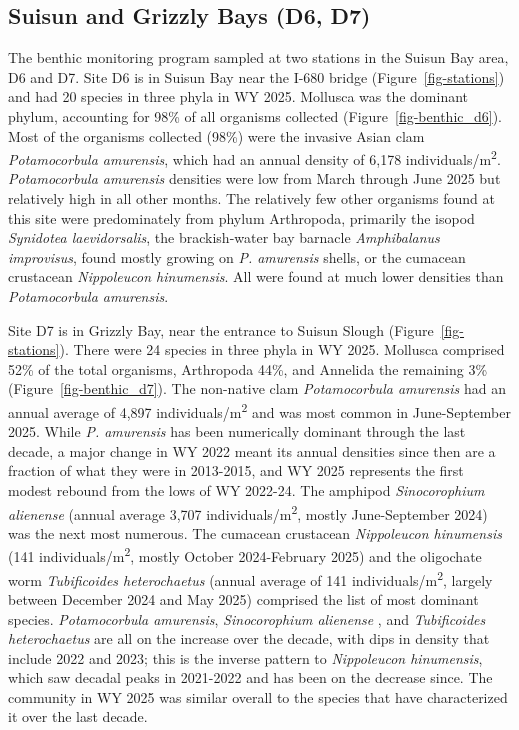 \documentclass[
  letterpaper,
]{article}
\begin{document}
\subsection{Suisun and Grizzly Bays (D6,
D7)}\label{suisun-and-grizzly-bays-d6-d7}

The benthic monitoring program sampled at two stations in the Suisun Bay
area, D6 and D7. Site D6 is in Suisun Bay near the I-680 bridge
(Figure~\ref{fig-stations}) and had 20 species in three phyla in WY
2025. Mollusca was the dominant phylum, accounting for 98\% of all
organisms collected (Figure~\ref{fig-benthic_d6}). Most of the organisms
collected (98\%) were the invasive Asian clam \emph{Potamocorbula
amurensis}, which had an annual density of 6,178
individuals/m\textsuperscript{2}. \emph{Potamocorbula amurensis}
densities were low from March through June 2025 but relatively high in
all other months. The relatively few other organisms found at this site
were predominately from phylum Arthropoda, primarily the isopod
\emph{Synidotea laevidorsalis}, the brackish-water bay barnacle
\emph{Amphibalanus improvisus}, found mostly growing on \emph{P.
amurensis} shells, or the cumacean crustacean \emph{Nippoleucon
hinumensis}. All were found at much lower densities than
\emph{Potamocorbula amurensis}.

Site D7 is in Grizzly Bay, near the entrance to Suisun Slough
(Figure~\ref{fig-stations}). There were 24 species in three phyla in WY
2025. Mollusca comprised 52\% of the total organisms, Arthropoda 44\%,
and Annelida the remaining 3\% (Figure~\ref{fig-benthic_d7}). The
non-native clam \emph{Potamocorbula amurensis} had an annual average of
4,897 individuals/m\textsuperscript{2} and was most common in
June-September 2025. While \emph{P. amurensis} has been numerically
dominant through the last decade, a major change in WY 2022 meant its
annual densities since then are a fraction of what they were in
2013-2015, and WY 2025 represents the first modest rebound from the lows
of WY 2022-24. The amphipod \emph{Sinocorophium alienense} (annual
average 3,707 individuals/m\textsuperscript{2}, mostly June-September
2024) was the next most numerous. The cumacean crustacean
\emph{Nippoleucon hinumensis} (141 individuals/m\textsuperscript{2},
mostly October 2024-February 2025) and the oligochate worm
\emph{Tubificoides heterochaetus} (annual average of 141
individuals/m\textsuperscript{2}, largely between December 2024 and May
2025) comprised the list of most dominant species. \emph{Potamocorbula
amurensis}, \emph{Sinocorophium alienense} , and \emph{Tubificoides
heterochaetus} are all on the increase over the decade, with dips in
density that include 2022 and 2023; this is the inverse pattern to
\emph{Nippoleucon hinumensis}, which saw decadal peaks in 2021-2022 and
has been on the decrease since. The community in WY 2025 was similar
overall to the species that have characterized it over the last decade.
\end{document}
